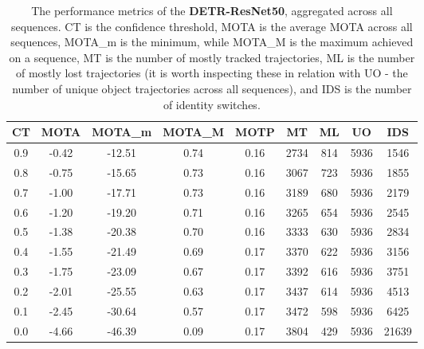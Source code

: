 \begin{table}[h]
    \centering
    \begin{tabular}{|c||c|c|c|c|c|c|c|c|}
        \hline
        CT & MOTA & MOTA\_m & MOTA\_M & MOTP & MT & ML & UO & IDS \\
        \hline
        \hline
        0.9 & -0.42 & -12.51 & 0.74 & 0.16 & 2734 & 814 & 5936 & 1546 \\
        \hline 
        0.8 & -0.75 & -15.65 & 0.73 & 0.16 & 3067 & 723 & 5936 & 1855 \\
        \hline 
        0.7 & -1.00 & -17.71 & 0.73 & 0.16 & 3189 & 680 & 5936 & 2179 \\
        \hline 
        0.6 & -1.20 & -19.20 & 0.71 & 0.16 & 3265 & 654 & 5936 & 2545 \\
        \hline 
        0.5 & -1.38 & -20.38 & 0.70 & 0.16 & 3333 & 630 & 5936 & 2834 \\
        \hline 
        0.4 & -1.55 & -21.49 & 0.69 & 0.17 & 3370 & 622 & 5936 & 3156 \\
        \hline 
        0.3 & -1.75 & -23.09 & 0.67 & 0.17 & 3392 & 616 & 5936 & 3751 \\
        \hline 
        0.2 & -2.01 & -25.55 & 0.63 & 0.17 & 3437 & 614 & 5936 & 4513 \\
        \hline 
        0.1 & -2.45 & -30.64 & 0.57 & 0.17 & 3472 & 598 & 5936 & 6425 \\
        \hline 
        0.0 & -4.66 & -46.39 & 0.09 & 0.17 & 3804 & 429 & 5936 & 21639 \\
        \hline 
    \end{tabular}
    \caption{The performance metrics of the \textbf{DETR-ResNet50}, aggregated across all sequences. CT is the confidence threshold, MOTA is the average MOTA across all sequences, MOTA\_m is the minimum, while MOTA\_M is the maximum achieved on a sequence, MT is the number of mostly tracked trajectories, ML is the number of mostly lost trajectories (it is worth inspecting these in relation with UO - the number of unique object trajectories across all sequences), and IDS is the number of identity switches.}
    \label{tab:mota_detr50}
\end{table}
